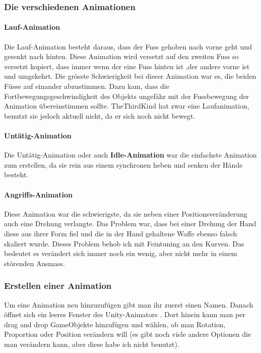 \subsubsection{Die verschiedenen Animationen}
\paragraph{Lauf-Animation}

Die Lauf-Animation besteht daraus, dass der Fuss gehoben nach vorne geht und gesenkt nach hinten. Diese Animation wird versetzt auf den zweiten Fuss so versetzt kopiert, dass immer wenn der eine Fuss hinten ist ,der andere vorne ist und umgekehrt. Die grösste Schwierigkeit bei dieser Animation war es, die beiden Füsse auf einander abzustimmen. Dazu kam, dass die Fortbewegungsgeschwindigkeit des Objekts ungefähr mit der Fussbewegung der Animation übereinstimmen sollte. TheThirdKind hat zwar eine Laufanimation, benutzt sie jedoch aktuell nicht, da er sich noch nicht bewegt.

\paragraph{Untätig-Animation}
Die Untätig-Animation oder auch \textbf{Idle-Animation} war die einfachste Animation zum erstellen, da sie rein aus einem synchronen heben und senken der Hände besteht.

\paragraph{Angriffs-Animation}

Diese Animation war die schwierigste, da sie neben einer Positionsveränderung auch eine Drehung verlangte.
Das Problem war, dass bei einer Drehung der Hand diese aus ihrer Form fiel und die in der Hand gehaltene Waffe ebenso falsch skaliert wurde.
Dieses Problem behob ich mit Feintuning an den Kurven.
Das bedeutet es verändert sich immer noch ein wenig, aber nicht mehr in einem störenden Ausmass.

\subsubsection{Erstellen einer Animation}
Um eine Animation neu hinzuzufügen gibt man ihr zuerst einen Namen.
Danach öffnet sich ein leeres Fenster des Unity-Animators 
.
Dort hinein kann man per drag and drop GameObjekte hinzufügen und wählen, ob man Rotation, Proportion oder Position verändern will (es gibt noch viele andere Optionen die man verändern 
kann, aber diese habe ich nicht benutzt).

